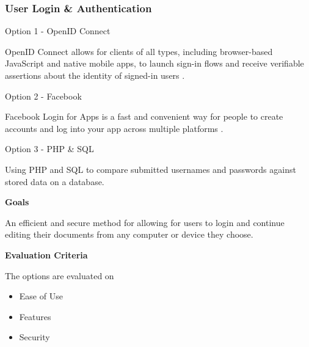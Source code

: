 \documentclass[letterpaper, 10pt, draftclsnofoot, compsoc, onecolumn]{IEEEtran}
\begin{document}
{\begin{comment}
\medskip
{\noindent\rmfamily\bfseries\color{black} Selection \par}
{\noindent Latex seems to be the best solution of the three, due to current experience using the software, as well as ease of use when creating large documents with multiple sections and headings. \par}

\end{comment}

\newpage
\subsubsection{User Login \& Authentication}
{\noindent Option 1 - OpenID Connect \par}
{\noindent OpenID Connect allows for clients of all types, including browser-based JavaScript and native mobile apps, to launch sign-in flows and receive verifiable assertions about the identity of signed-in users \cite{OpenID}. \par}

\medskip
{\noindent Option 2 - Facebook  \par}
{\noindent Facebook Login for Apps is a fast and convenient way for people to create accounts and log into your app across multiple platforms \cite{Facebook}. \par}

\medskip
{\noindent Option 3 - PHP \& SQL\par}
{\noindent Using PHP and SQL to compare submitted usernames and passwords against stored data on a database.\par}

\medskip
{\noindent\rmfamily\bfseries\color{black} Goals \par}
{\noindent An efficient and secure method for allowing for users to login and continue editing their documents from any computer or device they choose.\par}

\medskip
{\noindent\rmfamily\bfseries\color{black} Evaluation Criteria \par}
{\noindent The options are evaluated on 

\begin{itemize}
\item Ease of Use
\item Features
\item Security

\end{itemize}

}}
\end{document}
